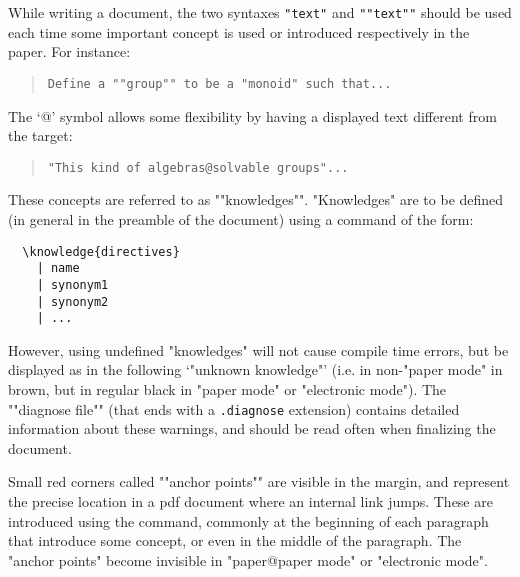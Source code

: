 \documentclass{article}
\begin{document}


\AP While writing a document, the two syntaxes \verb|"text"| and \verb|""text""| should be used each time some important concept is used or introduced respectively in the paper. For instance:
\begin{quote}
\verb|Define a ""group"" to be a "monoid" such that...|
\end{quote}
The `@' symbol allows some flexibility by having a displayed text different from the target:
\begin{quote}
\verb|"This kind of algebras@solvable groups"...|
\end{quote}

\AP These concepts are referred to as ""knowledges"". "Knowledges" are to be defined (in general in the preamble of the document) using a command of the form:
\begin{verbatim}
  \knowledge{directives}
    | name
    | synonym1
    | synonym2
    | ...
\end{verbatim}
However, using undefined "knowledges" will not cause compile time errors, but be displayed as in the following `"unknown knowledge"' (i.e. in non-"paper mode" in brown, but in regular black in "paper mode" or "electronic mode"). \AP The ""diagnose file"" (that ends with a \texttt{.diagnose} extension) contains detailed information about these warnings, and should be read often when finalizing the document.

\AP Small red corners called ""anchor points"" are visible in the margin, and represent the precise location in a pdf document where an internal link jumps. These are introduced
using the \texttt{\detokenize{\AP}}command, commonly at the beginning of each paragraph that introduce some concept, or even in the middle of the paragraph. The "anchor points" become invisible in "paper@paper mode" or "electronic mode".
\end{document}

